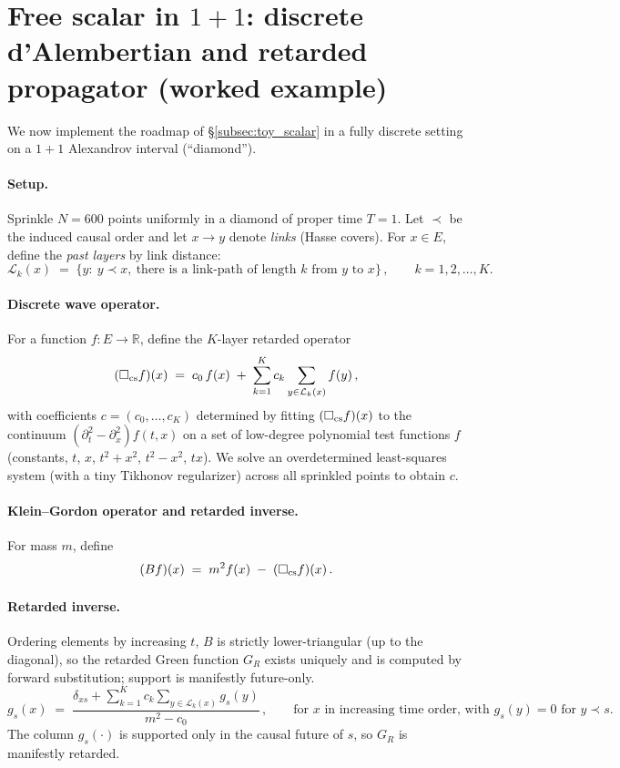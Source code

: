 \documentclass[12pt,a4paper]{article}
\begin{document}
\section{Free scalar in $1{+}1$: discrete d'Alembertian and retarded propagator (worked example)}\label{sec:free_scalar_1p1}

We now implement the roadmap of \S\ref{subsec:toy_scalar} in a fully discrete setting on a $1{+}1$ Alexandrov interval (``diamond'').

\paragraph{Setup.} Sprinkle $N=600$ points uniformly in a diamond of proper time $T=1$. Let $\prec$ be the induced causal order and let $x\to y$ denote \emph{links} (Hasse covers). For $x\in E$, define the \emph{past layers} by link distance:
\[
\mathcal{L}_k(x) \;=\; \{y:\ y\prec x,\ \text{there is a link-path of length $k$ from $y$ to $x$}\}\,,\qquad k=1,2,\dots,K.
\]

\paragraph{Discrete wave operator.} For a function $f:E\to\mathbb{R}$, define the $K$-layer retarded operator
\begin{equation}\label{eq:box_cs}
(\Box_{\rm cs} f)(x) \;=\; c_0\, f(x) \;+\; \sum_{k=1}^K c_k \sum_{y\in \mathcal{L}_k(x)} f(y)\,,
\end{equation}
with coefficients $c=(c_0,\dots,c_K)$ determined by fitting $(\Box_{\rm cs} f)(x)$ to the continuum $ (\partial_t^2-\partial_x^2) f(t,x)$ on a set of low-degree polynomial test functions $f$ (constants, $t$, $x$, $t^2+x^2$, $t^2-x^2$, $tx$). We solve an overdetermined least-squares system (with a tiny Tikhonov regularizer) across all sprinkled points to obtain $c$.

\paragraph{Klein--Gordon operator and retarded inverse.} For mass $m$, define
\begin{equation}\label{eq:B_operator}
(B f)(x) \;=\; m^2 f(x) \;-\; (\Box_{\rm cs} f)(x) \,.
\end{equation}
\paragraph{Retarded inverse.} Ordering elements by increasing $t$, $B$ is strictly lower-triangular (up to the diagonal), so the retarded Green function $G_R$ exists uniquely and is computed by forward substitution; support is manifestly future-only.
\begin{equation}\label{eq:forward_sub}
g_s(x) \;=\; \frac{\delta_{xs} + \sum_{k=1}^K c_k \sum_{y\in \mathcal{L}_k(x)} g_s(y)}{m^2 - c_0}\,,\qquad \text{for $x$ in increasing time order, with $g_s(y)=0$ for $y\prec s$.}
\end{equation}
The column $g_s(\cdot)$ is supported only in the causal future of $s$, so $G_R$ is manifestly retarded.
\end{document}
